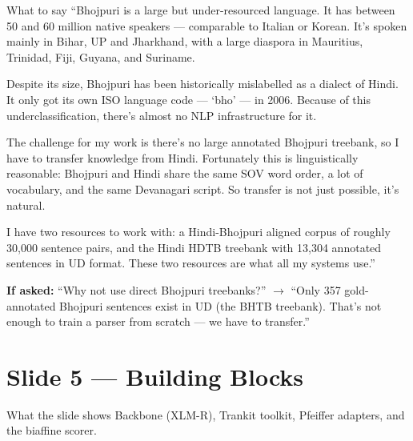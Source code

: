 \documentclass[11pt]{article}
\begin{document}
\begin{pitchbox}{What to say}
``Bhojpuri is a large but under-resourced language. It has between 50 and 60 million native speakers --- comparable to Italian or Korean. It's spoken mainly in Bihar, UP and Jharkhand, with a large diaspora in Mauritius, Trinidad, Fiji, Guyana, and Suriname.

Despite its size, Bhojpuri has been historically mislabelled as a dialect of Hindi. It only got its own ISO language code --- `bho' --- in 2006. Because of this underclassification, there's almost no NLP infrastructure for it.

The challenge for my work is there's no large annotated Bhojpuri treebank, so I have to transfer knowledge from Hindi. Fortunately this is linguistically reasonable: Bhojpuri and Hindi share the same SOV word order, a lot of vocabulary, and the same Devanagari script. So transfer is not just possible, it's natural.

I have two resources to work with: a Hindi-Bhojpuri aligned corpus of roughly 30,000 sentence pairs, and the Hindi HDTB treebank with 13,304 annotated sentences in UD format. These two resources are what all my systems use.''
\end{pitchbox}

\begin{tipbox}
\textbf{If asked:} ``Why not use direct Bhojpuri treebanks?'' $\to$ ``Only 357 gold-annotated Bhojpuri sentences exist in UD (the BHTB treebank). That's not enough to train a parser from scratch --- we have to transfer.''
\end{tipbox}

\section{Slide 5 --- Building Blocks}

\begin{pitchbox}{What the slide shows}
Backbone (XLM-R), Trankit toolkit, Pfeiffer adapters, and the biaffine scorer.
\end{pitchbox}
\end{document}
